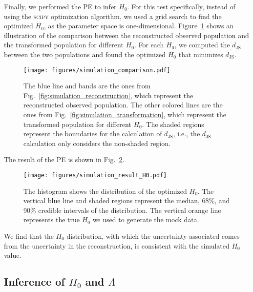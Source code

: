 \documentclass[sn-aps, pdflatex]{sn-jnl}
\begin{document}
Finally, we performed the \ac{PE} to infer $H_0$.
For this test specifically, instead of using the \textsc{scipy} optimization algorithm, we used a grid search to find the optimized $H_0$, as the parameter space is one-dimensional.
Figure~\ref{fig:simulation_comparison} shows an illustration of the comparison between the reconstructed observed population and the transformed population for different $H_0$.
For each $H_0$, we computed the $d_\mathrm{JS}$ between the two populations and found the optimized $H_0$ that minimizes $d_\mathrm{JS}$.
\begin{figure}[htbp]
    \texttt{[image: figures/simulation\_comparison.pdf]}
    \caption{
        The blue line and bands are the ones from Fig.~\ref{fig:simulation_reconstruction}, which represent the reconstructed observed population.
        The other colored lines are the ones from Fig.~\ref{fig:simulation_transformation}, which represent the transformed population for different $H_0$.
        The shaded regions represent the boundaries for the calculation of $d_\mathrm{JS}$, i.e., the $d_\mathrm{JS}$ calculation only considers the non-shaded region.
    }
    \label{fig:simulation_comparison}
\end{figure}

The result of the \ac{PE} is shown in Fig.~\ref{fig:simulation_result_H0}.
\begin{figure}[htbp]
    \texttt{[image: figures/simulation\_result\_H0.pdf]}
    \caption{
        The histogram shows the distribution of the optimized $H_0$.
        The vertical blue line and shaded regions represent the median, 68\%, and 90\% credible intervals of the distribution.
        The vertical orange line represents the true $H_0$ we used to generate the mock data.
    }
    \label{fig:simulation_result_H0}
\end{figure}
We find that the $H_0$ distribution, with which the uncertainty associated comes from the uncertainty in the reconstruction, is consistent with the simulated $H_0$ value.

\subsection{Inference of $H_0$ and $\Lambda$}
\label{sec:inference_multi}
\end{document}
